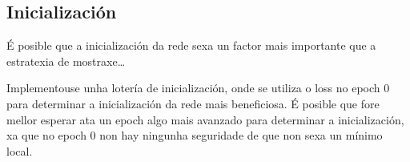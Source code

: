 \subsection{Inicialización}
\label{subsec:Inicialización}

É posible que a inicialización da rede sexa un factor mais importante que a estratexia de mostraxe\dots

Implementouse unha lotería de inicialización, onde se utiliza o loss no epoch 0 para determinar a inicialización da rede mais beneficiosa.
É posible que fore mellor esperar ata un epoch algo mais avanzado para determinar a inicialización, xa que no epoch 0 non hay ningunha seguridade de que non sexa un mínimo local.